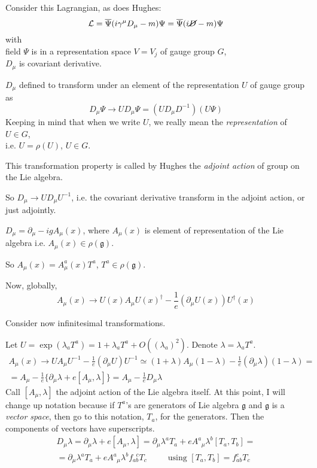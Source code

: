 \documentclass[10pt]{amsart}
\begin{document}
Consider this Lagrangian, as does Hughes:
\[
\mathcal{L} = \overline{\Psi} (i \gamma^{\mu} D_{\mu} - m ) \Psi = \overline{\Psi} (i \cancel{D} - m ) \Psi
\]
with \\
field $\Psi$ is in a representation space $V=V_j$ of gauge group $G$,  \\
$D_{\mu}$ is covariant derivative.

$D_{\mu}$ defined to transform under an element of the representation $U$ of gauge group as 
\[
D_{\mu} \Psi \to U D_{\mu} \Psi = (UD_{\mu} D^{-1})(U\Psi)
\]
Keeping in mind that when we write $U$, we really mean the \emph{representation} of $U \in G$, \\
i.e. $U=\rho(U)$, $U\in G$.

This transformation property is called by Hughes the \emph{adjoint action} of group on the Lie algebra.  

So $D_{\mu} \to UD_{\mu} U^{-1}$, i.e. the covariant derivative transform in the adjoint action, or just adjointly.  

$D_{\mu} = \partial_{\mu} - igA_{\mu}(x)$, where $A_{\mu}(x)$ is element of representation of the Lie algebra i.e. $A_{\mu}(x) \in \rho(\mathfrak{g})$.  

So $A_{\mu}(x) = A_{\mu}^a(x)T^a$, $T^a\in \rho(\mathfrak{g})$.  

Now, globally,
\[
A_{\mu}(x) \to U(x) A_{\mu}U(x)^{\dag} - \frac{1}{e} (\partial_{\mu} U(x))U^{\dag}(x)
\]

Consider now infinitesimal transformations.  

Let $U=\exp{ (\lambda_a T^a)} = 1 + \lambda_aT^a + O((\lambda_a)^2)$.  Denote $\lambda = \lambda_aT^a$.  
\[
\begin{gathered}
  A_{\mu}(x) \to UA_{\mu} U^{-1} - \frac{1}{e} (\partial_{\mu} U) U^{-1} \simeq (1+\lambda)A_{\mu}(1-\lambda) - \frac{1}{e} (\partial_{\mu} \lambda) (1-\lambda) = \\
  = A_{\mu} - \frac{1}{e} \lbrace  \partial_{\mu} \lambda + e[A_{\mu}, \lambda] \rbrace = A_{\mu} - \frac{1}{e} D_{\mu} \lambda
\end{gathered}
\]
Call $[A_{\mu}, \lambda]$ the adjoint action of the Lie algebra itself.  
At this point, I will change up notation because if $T^a$'s are generators of Lie algebra $\mathfrak{g}$ and $\mathfrak{g}$ is a \emph{vector space}, then go to this notation, $T_a$, for the generators.  Then the components of vectors have superscripts.  
\[
\begin{gathered}
  D_{\mu} \lambda = \partial_{\mu} \lambda + e[A_{\mu},\lambda ] = \partial_{\mu} \lambda^a T_a + eA^a_{ \; \; \mu} \lambda^b[T_a,T_b] = \\
  = \partial_{\mu} \lambda^a T_a + eA^a_{ \; \; \mu} \lambda^b f_{ab}^{ \; \; c} T_c \qquad \, \text{ using } [T_a,T_b] = f_{ab}^c T_c
\end{gathered}
\]
\end{document}
